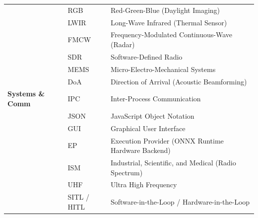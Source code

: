 \begin{table}[htbp]
\begin{tabularx}{\columnwidth}{@{}llX@{}}
& RGB & Red-Green-Blue (Daylight Imaging) \\
& LWIR & Long-Wave Infrared (Thermal Sensor) \\
& FMCW & Frequency-Modulated Continuous-Wave (Radar) \\
& SDR & Software-Defined Radio \\
& MEMS & Micro-Electro-Mechanical Systems \\
& DoA & Direction of Arrival (Acoustic Beamforming) \\
\midrule
\textbf{Systems \& Comm}
& IPC & Inter-Process Communication \\
& JSON & JavaScript Object Notation \\
& GUI & Graphical User Interface \\
& EP & Execution Provider (ONNX Runtime Hardware Backend) \\
& ISM & Industrial, Scientific, and Medical (Radio Spectrum) \\
& UHF & Ultra High Frequency \\
& SITL / HITL & Software-in-the-Loop / Hardware-in-the-Loop \\
\bottomrule
\end{tabularx}
\end{table}
